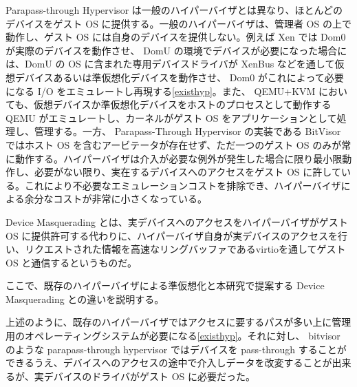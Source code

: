 \documentclass[a4paper,11pt,report]{ltjsbook}
\begin{document}
Parapass-through Hypervisor は一般のハイパーバイザとは異なり、ほとんどのデバイスをゲスト OS に提供する。一般のハイパーバイザは、管理者 OS の上で動作し、ゲスト OS には自身のデバイスを提供しない。例えば Xen では Dom0 が実際のデバイスを動作させ、 DomU の環境でデバイスが必要になった場合には、DomU の OS に含まれた専用デバイスドライバが XenBus などを通して仮想デバイスあるいは準仮想化デバイスを動作させ、 Dom0 がこれによって必要になる I/O をエミュレートし再現する\ref{existhyp}。また、 QEMU+KVM においても、仮想デバイスか準仮想化デバイスをホストのプロセスとして動作する QEMU がエミュレートし、カーネルがゲスト OS をアプリケーションとして処理し、管理する。一方、 Parapass-Through Hypervisor の実装である BitVisor ではホスト OS を含むアービテータが存在せず、ただ一つのゲスト OS のみが常に動作する。ハイパーバイザは介入が必要な例外が発生した場合に限り最小限動作し、必要がない限り、実在するデバイスへのアクセスをゲスト OS に許している。これにより不必要なエミュレーションコストを排除でき、ハイパーバイザによる余分なコストが非常に小さくなっている\cite{bitvisor}。

Device Masquerading とは、実デバイスへのアクセスをハイパーバイザがゲスト OS に提供許可する代わりに、ハイパーバイザ自身が実デバイスのアクセスを行い、リクエストされた情報を高速なリングバッファであるvirtio\cite{virtio}を通してゲスト OS と通信するというものだ。

ここで、既存のハイパーバイザによる準仮想化と本研究で提案する Device Masquerading との違いを説明する。

上述のように、既存のハイパーバイザではアクセスに要するパスが多い上に管理用のオペレーティングシステムが必要になる\ref{existhyp}。それに対し、 bitvisor のような parapass-through hypervisor ではデバイスを pass-through することができるうえ、デバイスへのアクセスの途中で介入しデータを改変することが出来るが、実デバイスのドライバがゲスト OS に必要だった。
\end{document}
